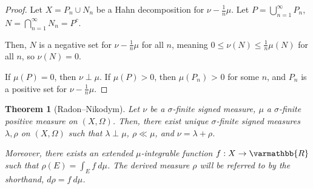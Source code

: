 \documentclass[12pt]{extarticle}
\newcommand{\R}{\mathbb{R}}
\theoremstyle{plain}
\newtheorem*{theorem}{Theorem}
\theoremstyle{definition}
\theoremstyle{note}
\renewcommand*{\mathbb}[1]{\varmathbb{#1}}
\renewcommand{\newline}{\hfill\break}
\begin{document}
\begin{proof}
  Let $X = P_n \cup N_n$ be a Hahn decomposition for $\nu - \frac{1}{n}\mu$. Let $P = \bigcup_{n=1}^{\infty}P_n$, $N = \bigcap_{n=1}^{\infty}N_n = P^{c}$.\newline

  Then, $N$ is a negative set for $\nu - \frac{1}{n}\mu$ for all $n$, meaning $0 \leq \nu(N) \leq \frac{1}{n}\mu(N)$ for all $n$, so $\nu\left(N\right) = 0$. \newline

  If $\mu(P) = 0$, then $\nu \perp \mu$. If $\mu(P) > 0$, then $\mu\left(P_n\right)$ > 0 for some $n$, and $P_n$ is a positive set for $\nu - \frac{1}{n}\mu$.
\end{proof}
\begin{theorem}[Radon--Nikodym]
  Let $\nu$ be a $\sigma$-finite signed measure, $\mu$ a $\sigma$-finite positive measure on $(X,\Omega)$. Then, there exist unique $\sigma$-finite signed measures $\lambda,\rho$ on $(X,\Omega)$ such that $\lambda \perp \mu$, $\rho \ll \mu$, and $\nu = \lambda + \rho$.\newline

  Moreover, there exists an extended $\mu$-integrable function $f: X\rightarrow \R$ such that $\rho(E) = \int_{E}^{} f\:d\mu$. The derived measure $\rho$ will be referred to by the shorthand, $d\rho = f\:d\mu$.
\end{theorem}
\end{document}
